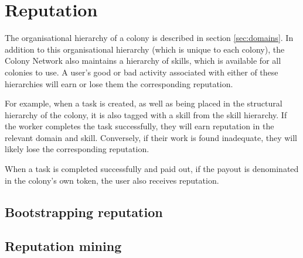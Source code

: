 \section{Reputation}


The organisational hierarchy of a colony is described in section \ref{sec:domains}. In addition to this organisational hierarchy (which is unique to each colony), the Colony Network also maintains a hierarchy of skills, which is available for all colonies to use. A user's good or bad activity associated with either of these hierarchies will earn or lose them the corresponding reputation.

For example, when a task is created, as well as being placed in the structural hierarchy of the colony, it is also tagged with a skill from the skill hierarchy. If the worker completes the task successfully, they will earn reputation in the relevant domain and skill. Conversely, if their work is found inadequate, they will likely lose the corresponding reputation.


When a task is completed successfully and paid out, if the payout is denominated in the colony's own token, the user also receives reputation. 


\subsection{Bootstrapping reputation}
\subsection{Reputation mining}\label{sec:reputationmining}

